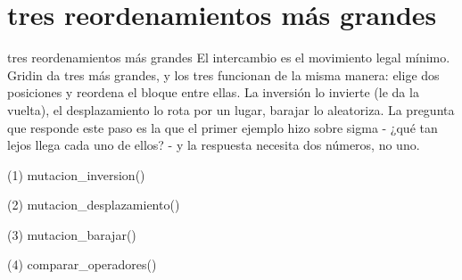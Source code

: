 \section{tres reordenamientos más grandes}

\begin{frame}{tres reordenamientos más grandes}
El intercambio es el movimiento legal mínimo. Gridin da tres más grandes, y los tres
funcionan de la misma manera: elige dos posiciones y reordena el bloque entre
ellas. La inversión lo invierte (le da la vuelta), el desplazamiento lo rota por un lugar, barajar
lo aleatoriza. La pregunta que responde este paso es la que el primer ejemplo hizo sobre
sigma - ¿qué tan lejos llega cada uno de ellos? - y la respuesta necesita dos números,
no uno.
\end{frame}

\begin{frame}[fragile]{(1) mutacion\_inversion()}

\end{frame}

\begin{frame}[fragile]{(2) mutacion\_desplazamiento()}

\end{frame}

\begin{frame}[fragile]{(3) mutacion\_barajar()}

\end{frame}

\begin{frame}[fragile]{(4) comparar\_operadores()}

\end{frame}


